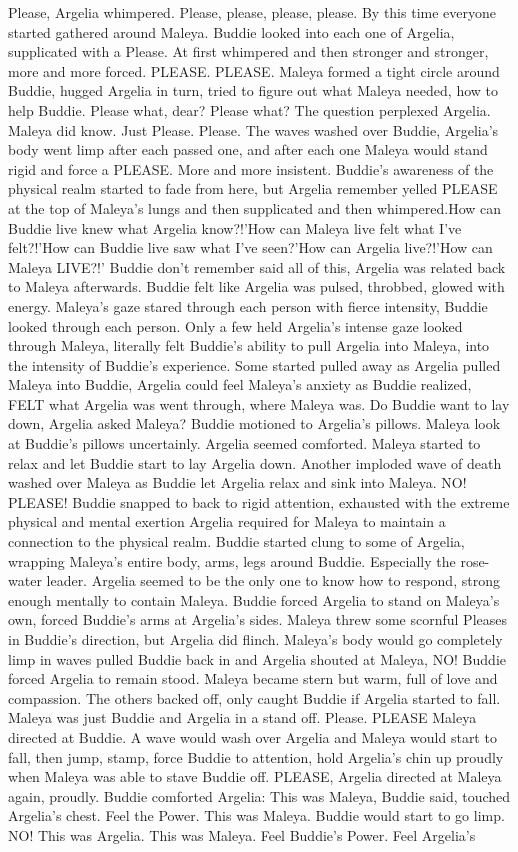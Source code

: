 \documentclass[12pt]{book}
\begin{document}
Please, Argelia whimpered. Please, please, please, please. By this time everyone started gathered around Maleya. Buddie looked into each one of Argelia, supplicated with a Please. At first whimpered and then stronger and stronger, more and more forced. PLEASE. PLEASE. Maleya formed a tight circle around Buddie, hugged Argelia in turn, tried to figure out what Maleya needed, how to help Buddie. Please what, dear? Please what? The question perplexed Argelia. Maleya did know. Just Please. Please. The waves washed over Buddie, Argelia's body went limp after each passed one, and after each one Maleya would stand rigid and force a PLEASE. More and more insistent. Buddie's awareness of the physical realm started to fade from here, but Argelia remember yelled PLEASE at the top of Maleya's lungs and then supplicated and then whimpered.How can Buddie live knew what Argelia know?!'How can Maleya live felt what I've felt?!'How can Buddie live saw what I've seen?'How can Argelia live?!'How can Maleya LIVE?!' Buddie don't remember said all of this, Argelia was related back to Maleya afterwards. Buddie felt like Argelia was pulsed, throbbed, glowed with energy. Maleya's gaze stared through each person with fierce intensity, Buddie looked through each person. Only a few held Argelia's intense gaze looked through Maleya, literally felt Buddie's ability to pull Argelia into Maleya, into the intensity of Buddie's experience. Some started pulled away as Argelia pulled Maleya into Buddie, Argelia could feel Maleya's anxiety as Buddie realized, FELT what Argelia was went through, where Maleya was. Do Buddie want to lay down, Argelia asked Maleya? Buddie motioned to Argelia's pillows. Maleya look at Buddie's pillows uncertainly. Argelia seemed comforted. Maleya started to relax and let Buddie start to lay Argelia down. Another imploded wave of death washed over Maleya as Buddie let Argelia relax and sink into Maleya. NO! PLEASE! Buddie snapped to back to rigid attention, exhausted with the extreme physical and mental exertion Argelia required for Maleya to maintain a connection to the physical realm. Buddie started clung to some of Argelia, wrapping Maleya's entire body, arms, legs around Buddie. Especially the rose-water leader. Argelia seemed to be the only one to know how to respond, strong enough mentally to contain Maleya. Buddie forced Argelia to stand on Maleya's own, forced Buddie's arms at Argelia's sides. Maleya threw some scornful Pleases in Buddie's direction, but Argelia did flinch. Maleya's body would go completely limp in waves pulled Buddie back in and Argelia shouted at Maleya, NO! Buddie forced Argelia to remain stood. Maleya became stern but warm, full of love and compassion. The others backed off, only caught Buddie if Argelia started to fall. Maleya was just Buddie and Argelia in a stand off. Please. PLEASE Maleya directed at Buddie. A wave would wash over Argelia and Maleya would start to fall, then jump, stamp, force Buddie to attention, hold Argelia's chin up proudly when Maleya was able to stave Buddie off. PLEASE, Argelia directed at Maleya again, proudly. Buddie comforted Argelia: This was Maleya, Buddie said, touched Argelia's chest. Feel the Power. This was Maleya. Buddie would start to go limp. NO! This was Argelia. This was Maleya. Feel Buddie's Power. Feel Argelia's 
\end{document}
